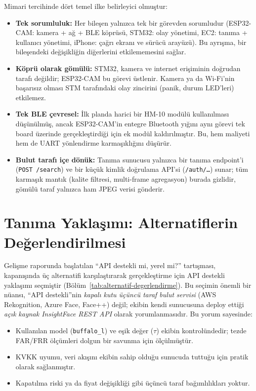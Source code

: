Mimari tercihinde dört temel ilke belirleyici olmuştur:

\begin{itemize}
    \item \textbf{Tek sorumluluk:} Her bileşen yalnızca tek bir görevden
          sorumludur (ESP32-CAM: kamera + ağ + BLE köprüsü, STM32: olay
          yönetimi, EC2: tanıma + kullanıcı yönetimi, iPhone: çağrı ekranı
          ve sürücü arayüzü). Bu ayrışma, bir bileşendeki değişikliğin
          diğerlerini etkilememesini sağlar.
    \item \textbf{Köprü olarak gömülü:} STM32, kamera ve internet erişiminin
          doğrudan tarafı değildir; ESP32-CAM bu görevi üstlenir. Kamera
          ya da Wi-Fi'nin başarısız olması STM tarafındaki olay zincirini
          (panik, durum LED'leri) etkilemez.
    \item \textbf{Tek BLE çevresel:} İlk planda harici bir HM-10 modülü
          kullanılması düşünülmüş, ancak ESP32-CAM'in entegre Bluetooth
          yığını aynı görevi tek board üzerinde gerçekleştirdiği için
          ek modül kaldırılmıştır. Bu, hem maliyeti hem de UART yönlendirme
          karmaşıklığını düşürür.
    \item \textbf{Bulut tarafı içe dönük:} Tanıma sunucusu yalnızca bir
          tanıma endpoint'i (\texttt{POST /search}) ve bir küçük kimlik
          doğrulama API'si (\texttt{/auth/\dots}) sunar; tüm karmaşık mantık
          (kalite filtresi, multi-frame agregasyon) burada gizlidir,
          gömülü taraf yalnızca ham JPEG verisi gönderir.
\end{itemize}

\section{Tanıma Yaklaşımı: Alternatiflerin Değerlendirilmesi}
\label{sec:alt-degerlendirme}

Gelişme raporunda \cite{ekin_gelisme_2026} başlatılan ``API destekli mi,
yerel mi?'' tartışması, kapanışında üç alternatifi karşılaştırarak
gerçekleştirme için API destekli yaklaşımı seçmiştir
(Bölüm~\ref{tab:alternatif-degerlendirme}). Bu seçimin önemli bir nüansı,
``API destekli''nin \emph{kapalı kutu üçüncü taraf bulut servisi}
(AWS Rekognition, Azure Face, Face++) değil; ekibin kendi sunucusuna
deploy ettiği \emph{açık kaynak InsightFace REST API} olarak
yorumlanmasıdır. Bu yorum sayesinde:

\begin{itemize}
    \item Kullanılan model (\texttt{buffalo\_l}) ve eşik değer
          ($\tau$) ekibin kontrolündedir; tezde FAR/FRR ölçümleri
          dolgun bir savunma için ölçülmüştür.
    \item KVKK uyumu, veri akışını ekibin sahip olduğu sunucuda
          tuttuğu için pratik olarak sağlanmıştır.
    \item Kapatılma riski ya da fiyat değişikliği gibi üçüncü taraf
          bağımlılıkları yoktur.
\end{itemize}

